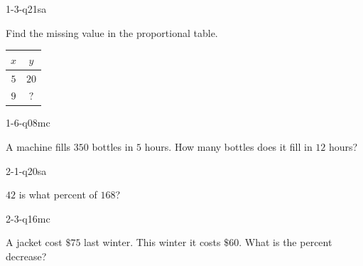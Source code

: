 
\begin{practiceQuestion}{1-3-q21}{sa}
\begin{questionText}
Find the missing value in the proportional table.

\begin{center}
\begin{tabular}{|c|c|}
\hline $x$ & $y$ \\ \hline $5$ & $20$ \\ $9$ & $?$ \\ \hline
\end{tabular}
\end{center}
\end{questionText}
\end{practiceQuestion}

\begin{practiceQuestion}{1-6-q08}{mc}
\begin{questionText}
A machine fills $350$ bottles in $5$ hours. How many bottles does it fill in $12$ hours?
\end{questionText}
\end{practiceQuestion}

\begin{practiceQuestion}{2-1-q20}{sa}
\begin{questionText}
$42$ is what percent of $168$?
\end{questionText}
\end{practiceQuestion}

\begin{practiceQuestion}{2-3-q16}{mc}
\begin{questionText}
A jacket cost $\$75$ last winter. This winter it costs $\$60$. What is the percent decrease?


\end{questionText}
\end{practiceQuestion}

